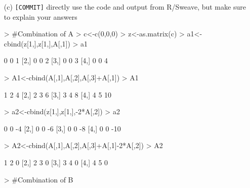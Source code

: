 \documentclass[12pt]{article}
\begin{document}
\begin{itemize}
    \item[(c)] \verb+[COMMIT]+   directly use the code and output from R/Sweave, but make sure
        to explain your answers
\begin{Schunk}
\begin{Sinput}
> #Combination of A
> c<-c(0,0,0)
> z<-as.matrix(c)
> a1<-cbind(z[1,],z[1,],A[,1])
> a1
\end{Sinput}
\begin{Soutput}
     [,1] [,2] [,3]
[1,]    0    0    1
[2,]    0    0    2
[3,]    0    0    3
[4,]    0    0    4
\end{Soutput}
\begin{Sinput}
> A1<-cbind(A[,1],A[,2],A[,3]+A[,1])
> A1
\end{Sinput}
\begin{Soutput}
     [,1] [,2] [,3]
[1,]    1    2    4
[2,]    2    3    6
[3,]    3    4    8
[4,]    4    5   10
\end{Soutput}
\begin{Sinput}
> a2<-cbind(z[1,],z[1,],-2*A[,2])
> a2
\end{Sinput}
\begin{Soutput}
     [,1] [,2] [,3]
[1,]    0    0   -4
[2,]    0    0   -6
[3,]    0    0   -8
[4,]    0    0  -10
\end{Soutput}
\begin{Sinput}
> A2<-cbind(A[,1],A[,2],A[,3]+A[,1]-2*A[,2])
> A2
\end{Sinput}
\begin{Soutput}
     [,1] [,2] [,3]
[1,]    1    2    0
[2,]    2    3    0
[3,]    3    4    0
[4,]    4    5    0
\end{Soutput}
\begin{Sinput}
> #Combination of B
\end{Sinput}
\end{Schunk}




\end{itemize}
\end{document}
